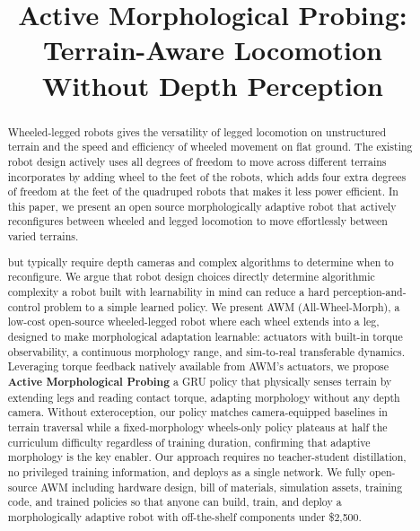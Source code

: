 \documentclass{article}
\title{Active Morphological Probing: Terrain-Aware Locomotion Without Depth Perception}
\author{
}
\begin{document}
\maketitle


\begin{abstract}
Wheeled-legged robots gives the versatility of legged locomotion on unstructured terrain and the
speed and efficiency of wheeled movement on flat ground. The existing robot design actively uses all 
degrees of freedom to move across different terrains
incorporates 
by adding wheel to the feet of the robots, which adds four extra degrees of freedom at the feet 
of the quadruped robots that makes it less power efficient. In this paper, we present an open source
morphologically adaptive robot that actively reconfigures between wheeled and legged locomotion to move
effortlessly between varied terrains. 

but typically require depth cameras and complex algorithms
to determine when to reconfigure. We argue that robot design choices directly determine
algorithmic complexity a robot built with learnability in mind can reduce a hard
perception-and-control problem to a simple learned policy. We present AWM (All-Wheel-Morph),
a low-cost open-source wheeled-legged robot where each wheel extends into a leg, designed
to make morphological adaptation learnable: actuators with built-in torque observability,
a continuous morphology range, and sim-to-real transferable dynamics. Leveraging torque
feedback natively available from AWM's actuators, we propose \textbf{Active Morphological
Probing} a GRU policy that physically senses terrain by extending legs and reading
contact torque, adapting morphology without any depth camera. Without exteroception, our
policy matches camera-equipped baselines in terrain traversal while a fixed-morphology
wheels-only policy plateaus at half the curriculum difficulty regardless of training
duration, confirming that adaptive morphology is the key enabler. Our approach requires
no teacher-student distillation, no privileged training information, and deploys as a
single network. We fully open-source AWM including hardware design, bill of materials,
simulation assets, training code, and trained policies so that anyone can build, train,
and deploy a morphologically adaptive robot with off-the-shelf components under \$2,500.
\end{abstract}

\end{document}
